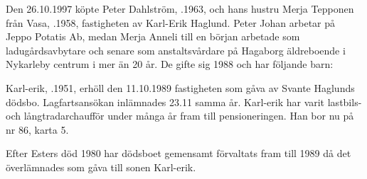 %



%
Den 26.10.1997 köpte Peter Dahlström, .1963, och hans hustru Merja Tepponen från Vasa, .1958, fastigheten av Karl-Erik Haglund. Peter Johan arbetar på Jeppo Potatis Ab, medan Merja Anneli till en början arbetade som ladugårdsavbytare och senare som anstaltsvårdare på Hagaborg äldreboende i Nykarleby centrum i mer än 20 år. De gifte sig 1988 och har följande barn:
\begin{jhchildren}
  \item {}
  \item {}
  \item {}
  \item {}
  \item {}
\end{jhchildren}


%
Karl-erik, .1951, erhöll den 11.10.1989 fastigheten som gåva av Svante Haglunds dödsbo. Lagfartsansökan inlämnades 23.11 samma år. Karl-erik har varit lastbils- och långtradarchaufför under många år fram till pensioneringen. Han bor nu på nr 86, karta 5.


%
Efter Esters död 1980 har dödsboet gemensamt förvaltats fram till 1989 då det överlämnades som gåva till sonen Karl-erik.\jhvspace{}



